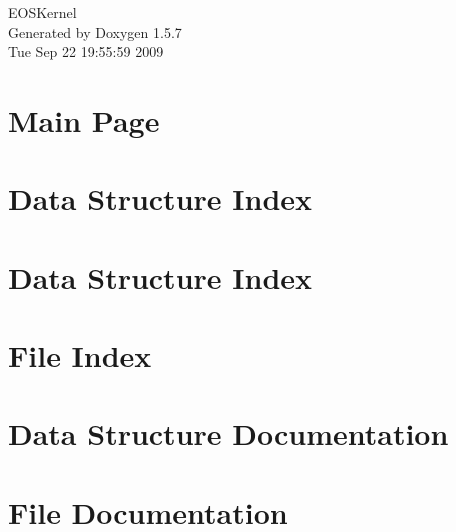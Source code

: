\documentclass[a4paper]{book}
\begin{document}
\begin{titlepage}
\vspace*{7cm}
\begin{center}
{\Large EOSKernel }\\
\vspace*{1cm}
{\large Generated by Doxygen 1.5.7}\\
\vspace*{0.5cm}
{\small Tue Sep 22 19:55:59 2009}\\
\end{center}
\end{titlepage}
\clearemptydoublepage
{}
\tableofcontents
\clearemptydoublepage
{}
\chapter{Main Page}
\label{index}\hypertarget{index}{}
\chapter{Data Structure Index}

\chapter{Data Structure Index}

\chapter{File Index}

\chapter{Data Structure Documentation}











\chapter{File Documentation}

















\printindex
\end{document}

